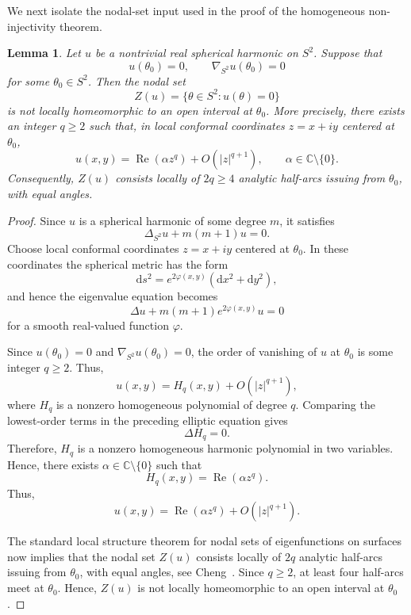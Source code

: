 \documentclass[10pt]{amsart}
\numberwithin{equation}{section}
\newtheorem{lemma}[theorem]{Lemma}
\theoremstyle{definition}
\newcommand{\C}{\mathbb C}
\begin{document}
We next isolate the nodal-set input used in the proof of the homogeneous
non-injectivity theorem.

\begin{lemma}
\label{lem:critical-zero-nodal-crossing}
Let \(u\) be a nontrivial real spherical harmonic on \(S^2\). Suppose that
\[
        u(\theta_0)=0,
        \qquad
        \nabla_{S^2}u(\theta_0)=0
\]
for some \(\theta_0\in S^2\). Then the nodal set
\[
        Z(u)=\{\theta\in S^2:u(\theta)=0\}
\]
is not locally homeomorphic to an open interval at \(\theta_0\). More
precisely, there exists an integer \(q\ge2\) such that, in local conformal
coordinates \(z=x+iy\) centered at \(\theta_0\),
\[
        u(x,y)=\operatorname{Re}(\alpha z^q)+O(|z|^{q+1}),
        \qquad
        \alpha\in\C\setminus\{0\}.
\]
Consequently, \(Z(u)\) consists locally of \(2q\ge4\) analytic half-arcs
issuing from \(\theta_0\), with equal angles.
\end{lemma}

\begin{proof}
Since \(u\) is a spherical harmonic of some degree \(m\), it satisfies
\[
        \Delta_{S^2}u+m(m+1)u=0.
\]
Choose local conformal coordinates \(z=x+iy\) centered at \(\theta_0\). In
these coordinates the spherical metric has the form
\[
        \mathrm{d}s^2=e^{2\varphi(x,y)}(\mathrm{d}x^2+\mathrm{d}y^2),
\]
and hence the eigenvalue equation becomes
\[
        \Delta u+m(m+1)e^{2\varphi(x,y)}u=0
\]
for a smooth real-valued function \(\varphi\).

Since \(u(\theta_0)=0\) and \(\nabla_{S^2}u(\theta_0)=0\), the order of
vanishing of \(u\) at \(\theta_0\) is some integer \(q\ge2\). Thus,
\[
        u(x,y)=H_q(x,y)+O(|z|^{q+1}),
\]
where \(H_q\) is a nonzero homogeneous polynomial of degree \(q\). Comparing
the lowest-order terms in the preceding elliptic equation gives
\[
        \Delta H_q=0.
\]
Therefore, \(H_q\) is a nonzero homogeneous harmonic polynomial in two
variables. Hence, there exists \(\alpha\in\C\setminus\{0\}\) such that
\[
        H_q(x,y)=\operatorname{Re}(\alpha z^q).
\]
Thus,
\[
        u(x,y)=\operatorname{Re}(\alpha z^q)+O(|z|^{q+1}).
\]

The standard local structure theorem for nodal sets of eigenfunctions on
surfaces now implies that the nodal set \(Z(u)\) consists locally of \(2q\)
analytic half-arcs issuing from \(\theta_0\), with equal angles, see
Cheng~\cite{Cheng1976}. Since \(q\ge2\), at least four half-arcs meet at
\(\theta_0\). Hence, \(Z(u)\) is not locally homeomorphic to an open interval
at \(\theta_0\).
\end{proof}
\end{document}
